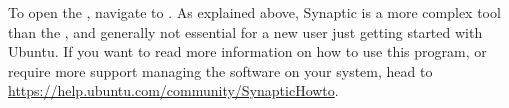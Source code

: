 To open the , navigate to . As explained above, Synaptic is a more complex tool than the , and generally not essential for a new user just getting started with Ubuntu. If you want to read more information on how to use this program, or require more support managing the software on your system, head to \url{https://help.ubuntu.com/community/SynapticHowto}. 

\begin{comment}
Using this package manager is very simple once you understand the basics behind it. Ideally, you will mark different actions to perform on different packages first, and then apply your changes. When you click the \button{Apply} button, the \application{Synaptic Package Manager} will do each of your marked actions, one by one. Then you will be free to close the program, or wait until the process is complete to make more changes.

\marginnote{If you are not very familiar with advanced computing in Ubuntu you may wish to stick with the \application{Software Center}.}

\subsubsection{Finding what you want}

If you are having difficulties finding the package you are looking for, you may try the \textbf{Quick search} box, the \button{Search} button (which opens a search dialog) or sort by the categories in the left side pane.

You can use the \button{Reload} button when you have made changes to your software sources, such as adding or removing repositories, so that the package manager can notice the changes and act accordingly.

\subsubsection{Applying your changes}

Once you find the package you are looking for, you can just open its right-click menu and there you will see listed all the actions you can perform on it. You can alternatively access these options through the \menu{Package} menu.

When you are ready marking actions, click the \button{Apply} button and wait until the changes are made. Afterward, you can close the application or mark more changes.
\end{comment}


